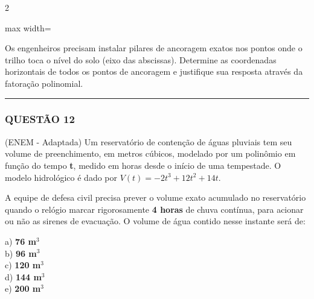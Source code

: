 \documentclass[twoside, 10pt, a4paper]{article}
\begin{document}
\begin{multicols*}{2}
\begin{center}
\begin{adjustbox}{max width=\linewidth}
\end{adjustbox}
\end{center}

Os engenheiros precisam instalar pilares de ancoragem exatos nos pontos onde o trilho toca o nível do solo (eixo das abscissas). Determine as coordenadas horizontais de todos os pontos de ancoragem e justifique sua resposta através da fatoração polinomial.

\vspace{0cm} \noindent\textcolor{CorLinha}{\rule{\linewidth}{0.5pt}} \vspace{-0.2cm}
\subsubsection*{QUESTÃO 12}

(ENEM - Adaptada) Um reservatório de contenção de águas pluviais tem seu volume de preenchimento, em metros cúbicos, modelado por um polinômio em função do tempo \textbf{t}, medido em horas desde o início de uma tempestade. O modelo hidrológico é dado por $ V(t) = -2t^3 + 12t^2 + 14t $.

A equipe de defesa civil precisa prever o volume exato acumulado no reservatório quando o relógio marcar rigorosamente \textbf{4 horas} de chuva contínua, para acionar ou não as sirenes de evacuação. O volume de água contido nesse instante será de:

a) \textbf{76 m$^3$}\\[0.3cm]
b) \textbf{96 m$^3$}\\[0.3cm]
c) \textbf{120 m$^3$}\\[0.3cm]
d) \textbf{144 m$^3$}\\[0.3cm]
e) \textbf{200 m$^3$}


\end{multicols*}
\end{document}
